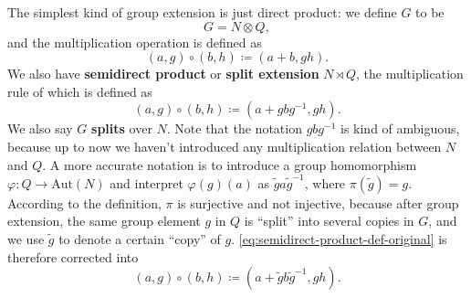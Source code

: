 \documentclass[hyperref, a4paper]{article}
\newcommand*{\concept}[1]{{\textbf{#1}}}
\begin{document}
The simplest kind of group extension is just direct product: we define $G$ to be 
\begin{equation}
    G = N \otimes Q,
\end{equation}
and the multiplication operation is defined as 
\begin{equation}
    (a, g) \circ (b, h) \coloneqq (a + b, g h).
    \label{eq:direct-product-def}
\end{equation}
We also have \concept{semidirect product} or \concept{split extension} $N \rtimes Q$, 
the multiplication rule of which is defined as 
\begin{equation}
    (a, g) \circ (b, h) \coloneqq (a + g b g^{-1}, gh).
    \label{eq:semidirect-product-def-original}
\end{equation}
We also say $G$ \concept{splits} over $N$. Note that the notation $g b g^{-1}$ is kind of ambiguous,
because up to now we haven't introduced any multiplication relation between $N$ and $Q$.
A more accurate notation is to introduce a group homomorphism $\varphi: Q \to \mathrm{Aut}(N)$
and interpret $\varphi(g)(a)$ as $\tilde{g} a \tilde{g}^{-1}$, where $\pi(\tilde{g}) = g$. 
According to the definition, $\pi$ is surjective and not injective, because after group extension, 
the same group element $g$ in $Q$ is ``split'' into several copies in $G$, and we use $\tilde{g}$
to denote a certain ``copy'' of $g$. \eqref{eq:semidirect-product-def-original} is therefore corrected into 
\begin{equation}
    (a, g) \circ (b, h) \coloneqq (a + \tilde{g} b \tilde{g}^{-1}, gh).
    \label{eq:semidirect-product-def}
\end{equation}
\end{document}
